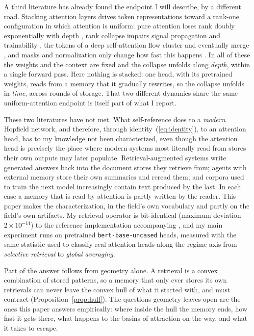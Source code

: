 \documentclass[preprint,12pt,authoryear]{elsarticle}
\begin{document}
A third literature has already found the endpoint I will describe, by a
different road. Stacking attention layers drives token representations
toward a rank-one configuration in which attention is uniform: pure
attention loses rank doubly exponentially with depth
\citep{dong2021}, rank collapse impairs signal propagation and
trainability \citep{noci2022}, the tokens of a deep self-attention flow
cluster and eventually merge \citep{geshkovski2025}, and masks and
normalization only change how fast this happens \citep{wu2024}. In all of
these the weights and the context are fixed and the collapse unfolds
along \emph{depth}, within a single forward pass. Here nothing is stacked:
one head, with its pretrained weights, reads from a memory that it
gradually rewrites, so the collapse unfolds in \emph{time}, across
rounds of storage. That two different dynamics share the same
uniform-attention endpoint is itself part of what I report.

These two literatures have not met. What self-reference does to a
\emph{modern} Hopfield network, and therefore, through
identity~(\ref{eq:identity}), to an attention head, has to my knowledge
not been characterized, even though the attention head is precisely the
place where modern systems most literally read from stores their own
outputs may later populate. Retrieval-augmented systems write generated
answers back into the document stores they retrieve from; agents with
external memory store their own summaries and reread them; and corpora
used to train the next model increasingly contain text produced by the
last. In each case a memory that is read by attention is partly written
by the reader. This paper makes the characterization, in the
field's own vocabulary and partly on the field's own artifacts. My
retrieval operator is bit-identical (maximum deviation $2\times10^{-14}$) to
the reference implementation accompanying \citet{ramsauer2021}, and my main
experiment runs on pretrained \texttt{bert-base-uncased} heads, measured
with the same statistic \citet{ramsauer2021} used to classify real attention
heads along the regime axis from \emph{selective retrieval} to \emph{global
averaging}.

Part of the answer follows from geometry alone. A retrieval is a convex
combination of stored patterns, so a memory that only ever stores its own
retrievals can never leave the convex hull of what it started with, and
must contract (Proposition~\ref{prop:hull}). The questions geometry leaves
open are the ones this paper answers empirically: where inside the hull
the memory ends, how fast it gets there, what happens to the basins of
attraction on the way, and what it takes to escape.
\end{document}
